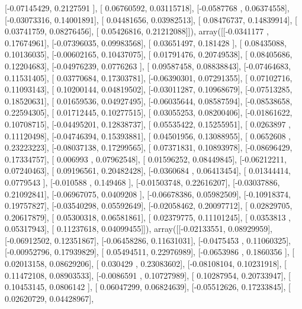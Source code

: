 \documentclass{article}
\begin{document}
       [-0.07145429,  0.2127591 ],
       [ 0.06760592,  0.03115718],
       [-0.0587768 ,  0.06374558],
       [-0.03073316,  0.14001891],
       [ 0.04481656,  0.03982513],
       [ 0.08476737,  0.14839914],
       [ 0.03741759,  0.08276456],
       [ 0.05426816,  0.21212088]]), array([[-0.0341177 ,  0.17674961],
       [-0.07396035,  0.09983568],
       [ 0.03651497,  0.181428  ],
       [ 0.08435088,  0.10136035],
       [-0.00602165,  0.10437075],
       [ 0.01791476,  0.20749538],
       [ 0.08405686,  0.12204683],
       [-0.04976239,  0.0776263 ],
       [ 0.09587458,  0.08838843],
       [-0.07464683,  0.11531405],
       [ 0.03770684,  0.17303781],
       [-0.06390301,  0.07291355],
       [ 0.07102716,  0.11093143],
       [ 0.10200144,  0.04819502],
       [-0.03011287,  0.10968679],
       [-0.07513285,  0.18520631],
       [ 0.01659536,  0.04927495],
       [-0.06035644,  0.08587594],
       [-0.08538658,  0.22594305],
       [ 0.01712445,  0.10277515],
       [ 0.03055253,  0.08200406],
       [-0.01861622,  0.10708715],
       [-0.04495201,  0.12838737],
       [ 0.05535422,  0.15255951],
       [ 0.0263897 ,  0.11120498],
       [-0.04746394,  0.15393881],
       [ 0.04501956,  0.13088955],
       [ 0.0652608 ,  0.23223223],
       [-0.08037138,  0.17299565],
       [ 0.07371831,  0.10893978],
       [-0.08696429,  0.17334757],
       [ 0.006993  ,  0.07962548],
       [ 0.01596252,  0.08449845],
       [-0.06212211,  0.07240463],
       [ 0.09196561,  0.20482428],
       [-0.0360684 ,  0.06413454],
       [ 0.01344414,  0.0779543 ],
       [-0.010588  ,  0.149468  ],
       [-0.01503748,  0.22616207],
       [-0.03037886,  0.21092841],
       [-0.06967075,  0.0409208 ],
       [-0.06678386,  0.05982509],
       [-0.10918374,  0.19757827],
       [-0.03540298,  0.05592649],
       [-0.02058462,  0.20097712],
       [ 0.02829705,  0.20617879],
       [ 0.05300318,  0.06581861],
       [ 0.02379775,  0.11101245],
       [ 0.0353813 ,  0.05317943],
       [ 0.11237618,  0.04099455]]), array([[-0.02133551,  0.08929959],
       [-0.06912502,  0.12351867],
       [-0.06458286,  0.11631031],
       [-0.0475453 ,  0.11060325],
       [-0.00952796,  0.17939829],
       [ 0.05494511,  0.22976989],
       [-0.0653986 ,  0.1860356 ],
       [ 0.02013158,  0.08629206],
       [ 0.030429  ,  0.23083602],
       [-0.08108104,  0.10231918],
       [ 0.11472108,  0.08903533],
       [-0.0086591 ,  0.10727989],
       [ 0.10287954,  0.20733947],
       [ 0.10453145,  0.0806142 ],
       [ 0.06047299,  0.06824639],
       [-0.05512626,  0.17233845],
       [ 0.02620729,  0.04428967],
\end{document}
